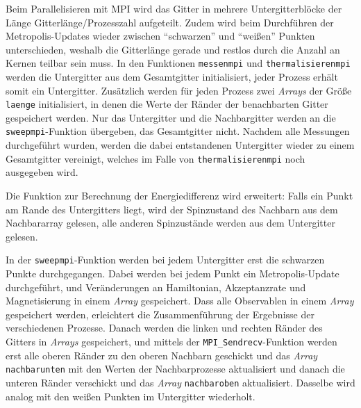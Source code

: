 	Beim Parallelisieren mit MPI wird das Gitter in mehrere Untergitterblöcke der Länge Gitterlänge/Prozesszahl aufgeteilt. Zudem wird beim Durchführen der Metropolis-Updates wieder zwischen \enquote{schwarzen} und \enquote{weißen} Punkten unterschieden, weshalb die Gitterlänge gerade und restlos durch die Anzahl an Kernen teilbar sein muss.
	In den Funktionen \texttt{messenmpi} und \texttt{thermalisierenmpi} werden die Untergitter aus dem Gesamtgitter initialisiert, jeder Prozess erhält somit ein Untergitter. Zusätzlich werden für jeden Prozess zwei \textit{Arrays} der Größe \texttt{laenge} initialisiert, in denen die Werte der Ränder der benachbarten Gitter gespeichert werden. Nur das Untergitter und die Nachbargitter werden an die \texttt{sweepmpi}-Funktion übergeben, das Gesamtgitter nicht. Nachdem alle Messungen durchgeführt wurden, werden die dabei entstandenen Untergitter wieder zu einem Gesamtgitter vereinigt, welches im Falle von \texttt{thermalisierenmpi} noch ausgegeben wird.
	
	Die Funktion zur Berechnung der Energiedifferenz wird erweitert: Falls ein Punkt am Rande des Untergitters liegt, wird der Spinzustand des Nachbarn aus dem Nachbararray gelesen, alle anderen Spinzustände werden aus dem Untergitter gelesen.%
	
	In der \texttt{sweepmpi}-Funktion werden bei jedem Untergitter erst die schwarzen Punkte durchgegangen. Dabei werden bei jedem Punkt ein Metropolis-Update durchgeführt, und Veränderungen an Hamiltonian, Akzeptanzrate und Magnetisierung in einem \textit{Array} gespeichert. Dass alle Observablen in einem \textit{Array} gespeichert werden, erleichtert die Zusammenführung der Ergebnisse der verschiedenen Prozesse. Danach werden die linken und rechten Ränder des Gitters in \textit{Arrays} gespeichert, und mittels der \texttt{MPI\_Sendrecv}-Funktion werden erst alle oberen Ränder zu den oberen Nachbarn geschickt und das \textit{Array} \texttt{nachbarunten} mit den Werten der Nachbarprozesse aktualisiert und danach die unteren Ränder verschickt und das \textit{Array} \texttt{nachbaroben} aktualisiert. Dasselbe wird analog mit den weißen Punkten im Untergitter wiederholt.
	
